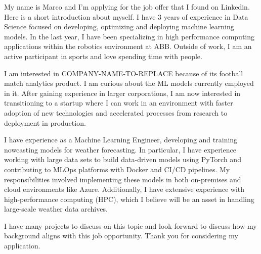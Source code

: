 \documentclass[11pt, a4paper]{awesome-cv}
\begin{document}
\makecvheader[R]

\begin{cvletter}

My name is Marco and I'm applying for the job offer that I found on Linkedin. Here is a short introduction about myself. I have 3 years of experience in Data Science focused on developing, optimizing and deploying machine learning models. In the last year, I have been specializing in high performance computing applications within the robotics environment at ABB. Outside of work, I am an active participant in sports and love spending time with people.


I am interested in COMPANY-NAME-TO-REPLACE because of its football match analytics product. I am curious about the ML models currently employed in it. After gaining experience in larger corporations, I am now interested in transitioning to a startup where I can work in an environment with faster adoption of new technologies and accelerated processes from research to deployment in production.


I have experience as a Machine Learning Engineer, developing and training nowcasting models for weather forecasting. In particular, I have experience working with large data sets to build data-driven models using PyTorch and contributing to MLOps platforms with Docker and CI/CD pipelines. My responsibilities involved implementing these models in both on-premises and cloud environments like Azure. Additionally, I have extensive experience with high-performance computing (HPC), which I believe will be an asset in handling large-scale weather data archives.

I have many projects to discuss on this topic and look forward to discuss how my background aligns with this job opportunity. Thank you for considering my application.

\end{cvletter}

\makeletterclosing
\end{document}
